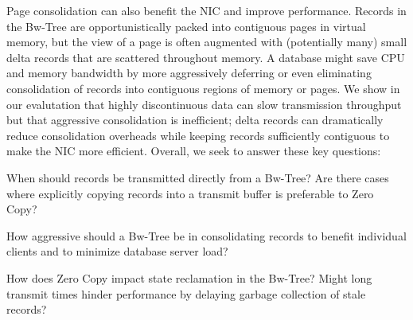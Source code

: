 Page consolidation can also benefit the NIC and improve performance.  Records
in the Bw-Tree are opportunistically packed into contiguous pages in virtual
memory, but the view of a page is often augmented with (potentially many)
small delta records that are scattered throughout memory.
A database might save CPU and memory bandwidth by more
aggressively deferring or even eliminating consolidation of records into
contiguous regions of memory or pages. We show in
our evalutation that highly discontinuous data can slow
transmission throughput but that aggressive consolidation is inefficient; delta
records can dramatically reduce consolidation overheads while keeping records
sufficiently contiguous to make the NIC more efficient.
Overall, we seek to answer these key questions:
\begin{myitemize}
\item
When should records be transmitted directly from a Bw-Tree? Are there cases
where explicitly copying records into a transmit buffer is preferable to Zero Copy?
\item
How aggressive should a Bw-Tree be in consolidating records to benefit individual
clients and to minimize database server load?
\item
How does Zero Copy impact state reclamation in the Bw-Tree? Might long transmit
times hinder performance by delaying garbage collection of stale records?
\end{myitemize}










